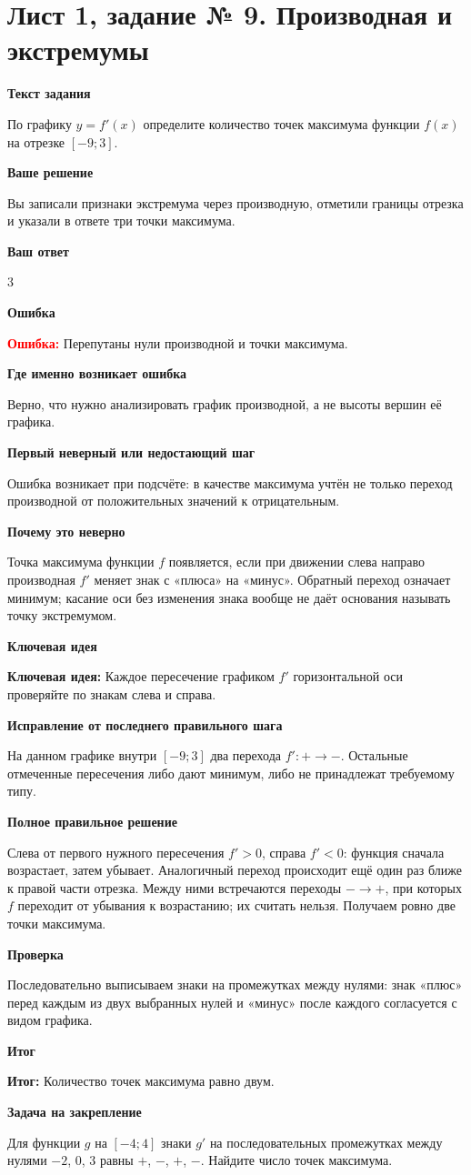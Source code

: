 \documentclass[11pt,a4paper]{article}
\newcommand{\Idea}{\textcolor{blue!60!black}{\textbf{Ключевая идея:}}}
\newcommand{\Res}{\textcolor{teal!60!black}{\textbf{Итог:}}}
\newcommand{\Heading}[2]{\par\medskip\textbf{#1}\par#2\par}
\begin{document}
\section*{Лист 1, задание № 9. Производная и экстремумы}
\Heading{Текст задания}{По графику $y=f\prime(x)$ определите количество точек максимума функции $f(x)$ на отрезке $[-9;3]$.}
\Heading{Ваше решение}{Вы записали признаки экстремума через производную, отметили границы отрезка и указали в ответе три точки максимума.}
\Heading{Ваш ответ}{$3$}
\Heading{Ошибка}{\textcolor{red}{\textbf{Ошибка:}} Перепутаны нули производной и точки максимума.}
\Heading{Где именно возникает ошибка}{Верно, что нужно анализировать график производной, а не высоты вершин её графика.}
\Heading{Первый неверный или недостающий шаг}{Ошибка возникает при подсчёте: в качестве максимума учтён не только переход производной от положительных значений к отрицательным.}
\Heading{Почему это неверно}{Точка максимума функции $f$ появляется, если при движении слева направо производная $f\prime$ меняет знак с «плюса» на «минус». Обратный переход означает минимум; касание оси без изменения знака вообще не даёт основания называть точку экстремумом.}
\Heading{Ключевая идея}{\Idea{} Каждое пересечение графиком $f\prime$ горизонтальной оси проверяйте по знакам слева и справа.}
\Heading{Исправление от последнего правильного шага}{На данном графике внутри $[-9;3]$ два перехода $f\prime:+\to-$. Остальные отмеченные пересечения либо дают минимум, либо не принадлежат требуемому типу.}
\Heading{Полное правильное решение}{Слева от первого нужного пересечения $f\prime>0$, справа $f\prime<0$: функция сначала возрастает, затем убывает. Аналогичный переход происходит ещё один раз ближе к правой части отрезка. Между ними встречаются переходы $-\to+$, при которых $f$ переходит от убывания к возрастанию; их считать нельзя. Получаем ровно две точки максимума.}
\Heading{Проверка}{Последовательно выписываем знаки на промежутках между нулями: знак «плюс» перед каждым из двух выбранных нулей и «минус» после каждого согласуется с видом графика.}
\Heading{Итог}{\Res{} Количество точек максимума равно двум.}
\Heading{Задача на закрепление}{Для функции $g$ на $[-4;4]$ знаки $g\prime$ на последовательных промежутках между нулями $-2$, $0$, $3$ равны $+$, $-$, $+$, $-$. Найдите число точек максимума.}
\newpage
{}\label{task:1_12}
\end{document}

